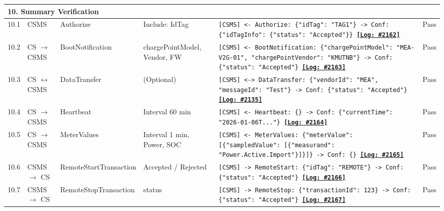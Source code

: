 \documentclass[10pt, a4paper, landscape]{article}
\begin{document}
\begin{longtable}{|p{1.0cm}|p{2.5cm}|p{4.0cm}|p{5.0cm}|p{10.0cm}|c|}
\multicolumn{6}{|l|}{\cellcolor{blue!10}\textbf{10. Summary Verification}} \\
\hline
10.1 & CSMS & Authorize & Include: IdTag & \footnotesize\texttt{[CSMS] <- Authorize: \{"idTag": "TAG1"\} \newline [CSMS] -> Conf: \{"idTagInfo": \{"status": "Accepted"\}\} \newline \hyperref[log:10.1]{\textbf{[Log: \#2162]}}} & Pass \\
\hline
10.2 & CS $\to$ CSMS & BootNotification & chargePointModel, Vendor, FW & \footnotesize\texttt{[CSMS] <- BootNotification: \{"chargePointModel": "MEA-V2G-01", "chargePointVendor": "KMUTNB"\} \newline [CSMS] -> Conf: \{"status": "Accepted"\} \newline \hyperref[log:10.2]{\textbf{[Log: \#2163]}}} & Pass \\
\hline
10.3 & CS $\leftrightarrow$ CSMS & DataTransfer & (Optional) & \footnotesize\texttt{[CSMS] <-> DataTransfer: \{"vendorId": "MEA", "messageId": "Test"\} \newline -> Conf: \{"status": "Accepted"\} \newline \hyperref[log:10.3]{\textbf{[Log: \#2135]}}} & Pass \\
\hline
10.4 & CS $\to$ CSMS & Heartbeat & Interval 60 min & \footnotesize\texttt{[CSMS] <- Heartbeat: \{\} \newline [CSMS] -> Conf: \{"currentTime": "2026-01-06T..."\} \newline \hyperref[log:10.4]{\textbf{[Log: \#2164]}}} & Pass \\
\hline
10.5 & CS $\to$ CSMS & MeterValues & Interval 1 min, Power, SOC & \footnotesize\texttt{[CSMS] <- MeterValues: \{"meterValue": [\{"sampledValue": [\{"measurand": "Power.Active.Import"\}]\}]\} \newline [CSMS] -> Conf: \{\} \newline \hyperref[log:10.5]{\textbf{[Log: \#2165]}}} & Pass \\
\hline
10.6 & CSMS $\to$ CS & RemoteStartTransaction & Accepted / Rejected & \footnotesize\texttt{[CSMS] -> RemoteStart: \{"idTag": "REMOTE"\} \newline [CS] -> Conf: \{"status": "Accepted"\} \newline \hyperref[log:10.6]{\textbf{[Log: \#2166]}}} & Pass \\
\hline
10.7 & CSMS $\to$ CS & RemoteStopTransaction & status & \footnotesize\texttt{[CSMS] -> RemoteStop: \{"transactionId": 123\} \newline [CS] -> Conf: \{"status": "Accepted"\} \newline \hyperref[log:10.7]{\textbf{[Log: \#2167]}}} & Pass \\

\end{longtable}
\end{document}
